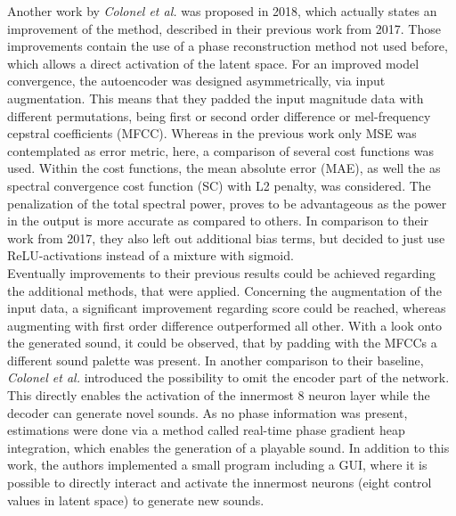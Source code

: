 Another work by \textit{Colonel et al.} was proposed in 2018, which actually states an improvement of the method, described in their previous work from 2017. \cite{colonel2018autoencoding} Those improvements contain the use of a phase reconstruction method not used before, which allows a direct activation of the latent space. For an improved model convergence, the autoencoder was designed asymmetrically, via input augmentation. This means that they padded the input magnitude data with different permutations, being first or second order difference or mel-frequency cepstral coefficients (MFCC). Whereas in the previous work only MSE was contemplated as error metric, here, a comparison of several cost functions was used. Within the cost functions, the mean absolute error (MAE), as well the as spectral convergence cost function (SC) with L2 penalty, was considered. The penalization of the total spectral power, proves to be advantageous as the power in the output is more accurate as compared to others. In comparison to their work from 2017, they also left out additional bias terms, but decided to just use ReLU-activations instead of a mixture with sigmoid.\\
Eventually improvements to their previous results could be achieved regarding the additional methods, that were applied. Concerning the augmentation of the input data, a significant improvement regarding score could be reached, whereas augmenting with first order difference outperformed all other. With a look onto the generated sound, it could be observed, that by padding with the MFCCs a different sound palette was present. In another comparison to their baseline, \textit{Colonel et al.} introduced the possibility to omit the encoder part of the network. This directly enables the activation of the innermost 8 neuron layer while the decoder can generate novel sounds. As no phase information was present, estimations were done via a method called real-time phase gradient heap integration, which enables the generation of a playable sound. In addition to this work, the authors implemented a small program including a GUI, where it is possible to directly interact and activate the innermost neurons (eight control values in latent space) to generate new sounds.\\

